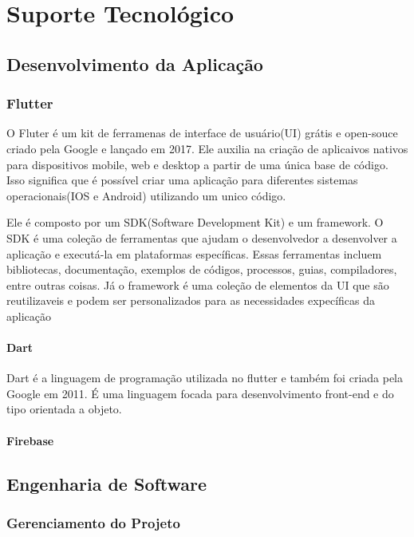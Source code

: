 \chapter[Suporte Tecnológico]{Suporte Tecnológico}

\section{Desenvolvimento da Aplicação}

\subsection{Flutter}

O Fluter é um kit de ferramenas de interface de usuário(UI) grátis e open-souce criado pela Google e lançado em 2017. Ele auxilia na criação de aplicaivos nativos para dispositivos mobile, web e desktop a partir de uma única base de código. Isso significa que é possível criar uma aplicação para diferentes sistemas operacionais(IOS e Android) utilizando um unico código.

Ele é composto por um SDK(Software Development Kit) e um framework. O SDK é uma coleção de ferramentas que ajudam o desenvolvedor a desenvolver a aplicação e executá-la em plataformas específicas. Essas ferramentas incluem bibliotecas, documentação, exemplos de códigos, processos, guias, compiladores, entre outras coisas. Já o framework é uma coleção de elementos da UI que são reutilizaveis e podem ser personalizados para as necessidades expecíficas da aplicação

\subsubsection{Dart}

Dart é a linguagem de programação utilizada no flutter e também foi criada pela Google em 2011. É uma linguagem focada para desenvolvimento front-end e do tipo orientada a objeto.

\subsubsection{Firebase}

\section{Engenharia de Software}

\subsection{Gerenciamento do Projeto}

